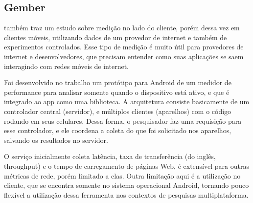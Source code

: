 \documentclass[12pt]{tcc}
\begin{document}
		\subsection{Gember}
		\par \citep{Gember2012Obtaining} também traz um estudo sobre medição no lado do cliente, porém dessa vez em clientes móveis, utilizando dados de um provedor de internet e também de experimentos controlados. Esse tipo de medição é muito útil para provedores de internet e desenvolvedores, que precisam entender como suas aplicações se saem interagindo com redes móveis de internet.
		\par Foi desenvolvido no trabalho um protótipo para Android de um medidor de performance para analisar somente quando o dispositivo está ativo, e que é integrado ao app como uma biblioteca. A arquitetura consiste basicamente de um controlador central (servidor), e múltiplos clientes (aparelhos) com o código rodando em seus celulares. Dessa forma, o pesquisador faz uma requisição para esse controlador, e ele coordena a coleta do que foi solicitado nos aparelhos, salvando os resultados no servidor.
		\par O serviço inicialmente coleta latência, taxa de transferência (do inglês, {throughput}) e o tempo de carregamento de páginas Web, é extensível para outras métricas de rede, porém limitado a elas. Outra limitação aqui é a utilização no cliente, que se encontra somente no sistema operacional Android, tornando pouco flexível a utilização dessa ferramenta nos contextos de pesquisas multiplataforma.
\end{document}
